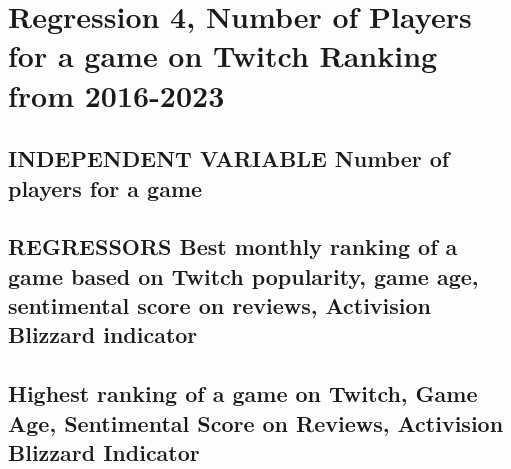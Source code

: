 \documentclass{report}
\begin{document}
\section*{Regression 4, Number of Players for a game on Twitch Ranking from 2016-2023}\bigskip
\subsection*{INDEPENDENT VARIABLE Number of players for a game}\bigskip
\subsection*{REGRESSORS Best monthly ranking of a game based on Twitch popularity, game age, sentimental score on reviews, Activision Blizzard indicator}\bigskip
\subsection*{Highest ranking of a game on Twitch, Game Age, Sentimental Score on Reviews, Activision Blizzard Indicator}\bigskip
\end{document}
